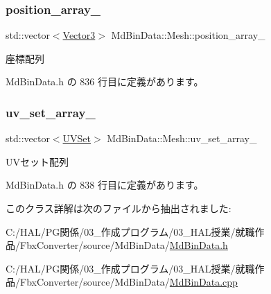 \subsubsection{\texorpdfstring{position\+\_\+array\+\_\+}{position\_array\_}}
{\footnotesize\ttfamily std\+::vector$<$\mbox{\hyperlink{class_md_bin_data_1_1_vector3}{Vector3}}$>$ Md\+Bin\+Data\+::\+Mesh\+::position\+\_\+array\+\_\+\hspace{0.3cm}{\ttfamily [private]}}



座標配列 



 Md\+Bin\+Data.\+h の 836 行目に定義があります。

\mbox{\label{class_md_bin_data_1_1_mesh_a50d8ce29adc888bbc28405870b6bdb2e}} 
\subsubsection{\texorpdfstring{uv\+\_\+set\+\_\+array\+\_\+}{uv\_set\_array\_}}
{\footnotesize\ttfamily std\+::vector$<$\mbox{\hyperlink{class_md_bin_data_1_1_mesh_1_1_u_v_set}{U\+V\+Set}}$>$ Md\+Bin\+Data\+::\+Mesh\+::uv\+\_\+set\+\_\+array\+\_\+\hspace{0.3cm}{\ttfamily [private]}}



U\+Vセット配列 



 Md\+Bin\+Data.\+h の 838 行目に定義があります。



このクラス詳解は次のファイルから抽出されました\+:\begin{DoxyCompactItemize}
\item 
C\+:/\+H\+A\+L/\+P\+G関係/03\+\_\+作成プログラム/03\+\_\+\+H\+A\+L授業/就職作品/\+Fbx\+Converter/source/\+Md\+Bin\+Data/\mbox{\hyperlink{_md_bin_data_8h}{Md\+Bin\+Data.\+h}}\item 
C\+:/\+H\+A\+L/\+P\+G関係/03\+\_\+作成プログラム/03\+\_\+\+H\+A\+L授業/就職作品/\+Fbx\+Converter/source/\+Md\+Bin\+Data/\mbox{\hyperlink{_md_bin_data_8cpp}{Md\+Bin\+Data.\+cpp}}\end{DoxyCompactItemize}
